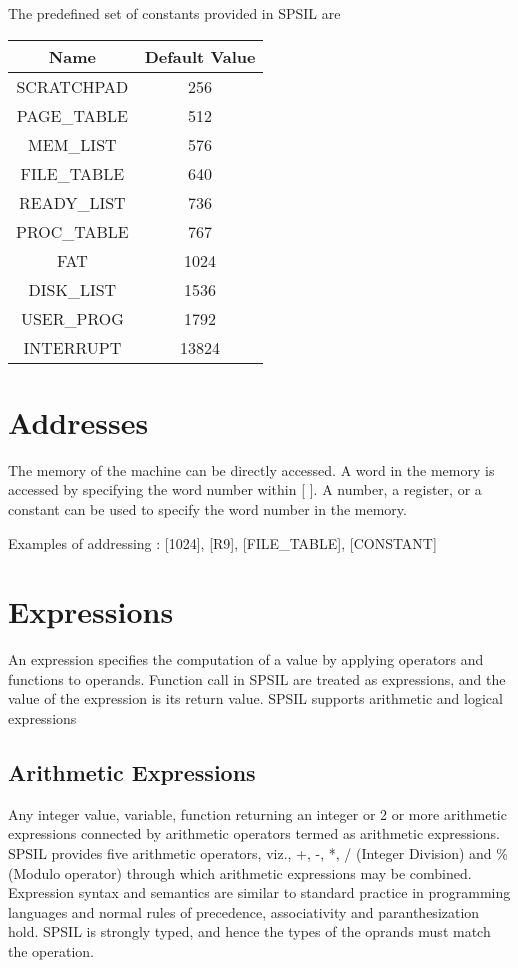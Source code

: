 \documentclass[11pt]{article}
\begin{document}
The predefined set of constants provided in SPSIL are \\

\begin{tabular}{| c | c |}
\hline
\textbf{Name} & \textbf{Default Value} \\
\hline
SCRATCHPAD 	& 	256 \\
\hline
PAGE\_TABLE 	& 	512  \\
\hline
MEM\_LIST 	&	576 	\\
\hline
FILE\_TABLE 	& 	640		\\
\hline
READY\_LIST 	& 	736	\\
\hline
PROC\_TABLE 	& 	767 \\
\hline
FAT 		& 	1024    \\
\hline
DISK\_LIST 	& 	1536 	\\
\hline
USER\_PROG 	& 	1792	\\
\hline
INTERRUPT & 	13824	\\
\hline
\end{tabular}

\section{Addresses}
The memory of the machine can be directly accessed. A word in the memory is accessed by specifying the word number within [ ]. A number, a register, or a constant can be used to specify the word number in the memory.

Examples of addressing : [1024], [R9], [FILE\_TABLE], [CONSTANT]

\section{Expressions}
An expression specifies the computation of a value by applying operators and functions to operands. Function call in SPSIL are treated as expressions, and the value of the expression is its return value. SPSIL supports arithmetic and logical expressions



\subsection{Arithmetic Expressions}

Any integer value, variable, function returning an integer or 2 or more arithmetic expressions connected by arithmetic operators termed as arithmetic expressions. SPSIL provides five arithmetic operators, viz., +, -, *, / (Integer Division) and \% (Modulo operator) through which arithmetic expressions may be combined. Expression syntax and semantics are similar to standard practice in programming languages and normal rules of precedence, associativity and paranthesization hold. SPSIL is strongly typed, and hence the types of the oprands must match the operation. 
\end{document}
